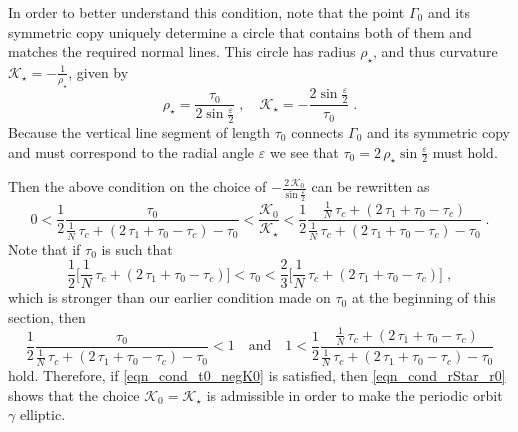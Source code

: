 \documentclass{amsart}
\theoremstyle{plain} %
\begin{document}
In order to better understand this condition, note that the point
$\Gamma_0$ and its symmetric copy uniquely determine
a circle that contains both of them and matches the required
normal lines.
This circle has radius ${\rho}_\star$, and thus curvature
${\mathcal K}_\star = -\frac{1}{{\rho}_\star}$, given by
\begin{equation}
  \label{eqn_circle_radius_fit}
  {\rho}_\star 
  =
  \frac{\tau_0}{ 2 \sin\frac{\varepsilon}{2} }
  \;,\quad
  {\mathcal K}_\star = - \frac{ 2 \sin\frac{\varepsilon}{2} }{\tau_0}
  \;.
\end{equation}
Because the vertical line segment of length $\tau_0$ connects
$\Gamma_0$ and its symmetric copy and must correspond
to the radial angle $\varepsilon$ we see that
$ \tau_0 = 2\,{\rho}_\star \sin\frac{\varepsilon}{2} $
must hold.

Then the above condition on the choice of
$- \frac{2\,{\mathcal K}_0}{\sin\frac{\varepsilon}{2} }$
can be rewritten as
\begin{equation}
  \label{eqn_cond_rStar_r0}
  0
  <
  \frac{1}{2}
  \frac{ \tau_0
  }{
  \frac{1}{N}\,\tau_c
  +
  (2\,\tau_1 + \tau_0 - \tau_c)
  -
  \tau_0
  }
  <
  \frac{{\mathcal K}_0}{ {\mathcal K}_\star }
  <
  \frac{1}{2}
  \frac{
  \frac{1}{N}\,\tau_c
  +
  (2\,\tau_1 + \tau_0 - \tau_c)
  }{
  \frac{1}{N}\,\tau_c
  +
  (2\,\tau_1 + \tau_0 - \tau_c)
  -
  \tau_0
  }
  \;.
\end{equation}
Note that if $\tau_0$ is such that
\begin{equation}
  \label{eqn_cond_t0_negK0}
  \frac{1}{2} \Big[
  \frac{1}{N}\,\tau_c
  +
  (2\,\tau_1 + \tau_0 - \tau_c)
  \Big]
  <
  \tau_0
  <
  \frac{2}{3}\Big[
  \frac{1}{N}\,\tau_c
  +
  (2\,\tau_1 + \tau_0 - \tau_c)
  \Big]
  \;,
\end{equation}
which is stronger than our earlier condition made on $\tau_0$
at the beginning of this section,
then
\begin{equation*}
  \frac{1}{2}
  \frac{ \tau_0
  }{
  \frac{1}{N}\,\tau_c
  +
  (2\,\tau_1 + \tau_0 - \tau_c)
  -
  \tau_0
  }
  <
  1
  \quad\text{and}\quad
  1
  <
  \frac{1}{2}
  \frac{
  \frac{1}{N}\,\tau_c
  +
  (2\,\tau_1 + \tau_0 - \tau_c)
  }{
  \frac{1}{N}\,\tau_c
  +
  (2\,\tau_1 + \tau_0 - \tau_c)
  -
  \tau_0
  }
\end{equation*}
hold. Therefore, if \eqref{eqn_cond_t0_negK0} is satisfied, then
\eqref{eqn_cond_rStar_r0} shows that
the choice ${\mathcal K}_0 = {\mathcal K}_\star$
is admissible in order to make the periodic orbit $\gamma$ elliptic.
\end{document}
